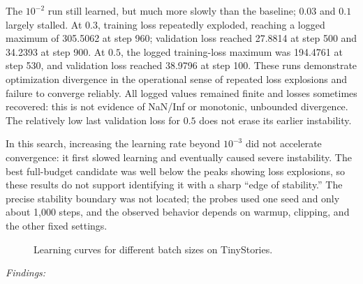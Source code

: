 The $10^{-2}$ run still learned, but much more slowly than the baseline;
$0.03$ and $0.1$ largely stalled. At $0.3$, training loss repeatedly exploded,
reaching a logged maximum of 305.5062 at step 960; validation loss reached
27.8814 at step 500 and 34.2393 at step 900.
At $0.5$, the logged training-loss maximum was 194.4761 at step 530, and
validation loss reached 38.9796 at step 100. These runs demonstrate optimization
divergence in the operational sense of repeated loss explosions and failure
to converge reliably. All logged values remained finite and losses sometimes
recovered: this is not evidence of NaN/Inf or monotonic, unbounded divergence.
The relatively low last validation loss for $0.5$ does not erase its earlier
instability.

In this search, increasing the learning rate beyond $10^{-3}$ did not accelerate
convergence: it first slowed learning and eventually caused severe instability.
The best full-budget candidate was well below the peaks showing loss explosions,
so these results do not support identifying it with a sharp ``edge of stability.''
The precise stability boundary was not located; the probes used one seed and
only about 1,000 steps, and the observed behavior depends on warmup, clipping,
and the other fixed settings.




\begin{figure}[H]
    \centering
    \caption{Learning curves for different batch sizes on TinyStories.}
    \label{fig:batch_size}
\end{figure}


\textit{Findings:} %





